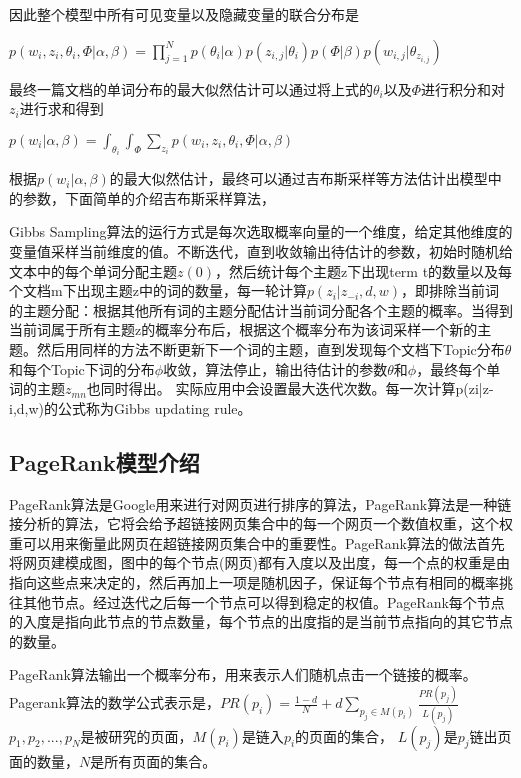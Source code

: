 \documentclass[master]{njuthesis}
\begin{document}
    因此整个模型中所有可见变量以及隐藏变量的联合分布是

    $p(w_i, z_i, \theta_i, \Phi | \alpha, \beta) = \prod_{j = 1}^{N} p(\theta_i|\alpha)p(z_{i, j}|\theta_i)p(\Phi|\beta)p(w_{i, j}|\theta_{z_{i, j}})$

    最终一篇文档的单词分布的最大似然估计可以通过将上式的$\theta_i$以及$\Phi$进行积分和对$z_i$进行求和得到

    $p(w_i | \alpha, \beta)  = \int_{\theta_i}\int_{\Phi }\sum_{z_i}p(w_i, z_i, \theta_i, \Phi | \alpha, \beta)$

    根据$p(w_i | \alpha, \beta)$的最大似然估计，最终可以通过吉布斯采样等方法估计出模型中的参数，下面简单的介绍吉布斯采样算法，
    
    Gibbs Sampling算法的运行方式是每次选取概率向量的一个维度，给定其他维度的变量值采样当前维度的值。不断迭代，直到收敛输出待估计的参数，初始时随机给文本中的每个单词分配主题$z\left(0\right)$，然后统计每个主题z下出现term t的数量以及每个文档m下出现主题z中的词的数量，每一轮计算$p\left(z_i|z_{-i},d,w\right)$，即排除当前词的主题分配：根据其他所有词的主题分配估计当前词分配各个主题的概率。当得到当前词属于所有主题z的概率分布后，根据这个概率分布为该词采样一个新的主题。然后用同样的方法不断更新下一个词的主题，直到发现每个文档下Topic分布$\theta$和每个Topic下词的分布$\phi$收敛，算法停止，输出待估计的参数$\theta$和$\phi$，最终每个单词的主题$z_{mn}$也同时得出。
实际应用中会设置最大迭代次数。每一次计算p(zi|z-i,d,w)的公式称为Gibbs updating rule。

\subsection{PageRank模型介绍}

    PageRank算法是Google用来进行对网页进行排序的算法\cite{PageRank}，PageRank算法是一种链接分析的算法，它将会给予超链接网页集合中的每一个网页一个数值权重，这个权重可以用来衡量此网页在超链接网页集合中的重要性。PageRank算法的做法首先将网页建模成图，图中的每个节点(网页)都有入度以及出度，每一个点的权重是由指向这些点来决定的，然后再加上一项是随机因子，保证每个节点有相同的概率挑往其他节点。经过迭代之后每一个节点可以得到稳定的权值。PageRank每个节点的入度是指向此节点的节点数量，每个节点的出度指的是当前节点指向的其它节点的数量。

    PageRank算法输出一个概率分布，用来表示人们随机点击一个链接的概率。Pagerank算法的数学公式表示是，$ PR\left(p_i\right) = \frac{1-d}{N}+d\sum_{p_j \in M\left(p_i\right)} \frac{PR\left(p_j\right)}{L\left(p_j\right)}$$p_1,p_2,...,p_N$是被研究的页面，$M\left(p_i\right)$是链入$p_i$的页面的集合， $L\left(p_j\right)$是$p_j$链出页面的数量，$N$是所有页面的集合。
\end{document}
